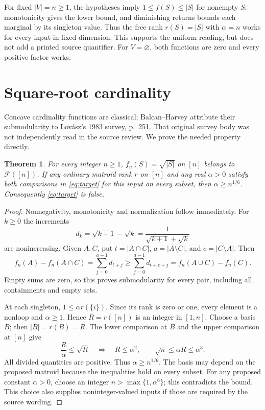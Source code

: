 \documentclass[11pt]{article}
\newtheorem{theorem}{Theorem}
\newcommand{\emptysetv}{\varnothing}
\begin{document}
For fixed $|V|=n\ge1$, the hypotheses imply $1\le f(S)\le |S|$ for nonempty $S$: monotonicity gives the lower bound, and diminishing returns bounds each marginal by its singleton value. Thus the free rank $r(S)=|S|$ with $\alpha=n$ works for every input in fixed dimension. This supports the uniform reading, but does not add a printed source quantifier. For $V=\emptysetv$, both functions are zero and every positive factor works.

\section{Square-root cardinality}
Concave cardinality functions are classical; Balcan--Harvey \cite[Section~5, Proposition~1]{bh} attribute their submodularity to Lov\'asz's 1983 survey, p.~251. That original survey body was not independently read in the source review. We prove the needed property directly.

\begin{theorem}\label{thm:sqrt}
For every integer $n\ge1$, $f_n(S)=\sqrt{|S|}$ on $[n]$ belongs to $\mathcal F([n])$. If any ordinary matroid rank $r$ on $[n]$ and any real $\alpha>0$ satisfy both comparisons in \eqref{eq:target} for this input on every subset, then $\alpha\ge n^{1/6}$. Consequently \eqref{eq:target} is false.
\end{theorem}
\begin{proof}
Nonnegativity, monotonicity and normalization follow immediately. For $k\ge0$ the increments
\[
 d_k=\sqrt{k+1}-\sqrt k=\frac1{\sqrt{k+1}+\sqrt k}
\]
are nonincreasing. Given $A,C$, put $t=|A\cap C|$, $a=|A\setminus C|$, and $c=|C\setminus A|$. Then
\[
 f_n(A)-f_n(A\cap C)=\sum_{j=0}^{a-1}d_{t+j}
 \ge\sum_{j=0}^{a-1}d_{t+c+j}
 =f_n(A\cup C)-f_n(C).
\]
Empty sums are zero, so this proves submodularity for every pair, including all containments and empty sets.

At each singleton, $1\le\alpha r(\{i\})$. Since its rank is zero or one, every element is a nonloop and $\alpha\ge1$. Hence $R=r([n])$ is an integer in $[1,n]$. Choose a basis $B$; then $|B|=r(B)=R$. The lower comparison at $B$ and the upper comparison at $[n]$ give
\[
 \frac R\alpha\le\sqrt R\quad\Longrightarrow\quad R\le\alpha^2,
 \qquad \sqrt n\le\alpha R\le\alpha^3.
\]
All divided quantities are positive. Thus $\alpha\ge n^{1/6}$. The basis may depend on the proposed matroid because the inequalities hold on every subset. For any proposed constant $\alpha>0$, choose an integer $n>\max\{1,\alpha^6\}$; this contradicts the bound. This choice also supplies noninteger-valued inputs if those are required by the source wording.
\end{proof}
\end{document}
